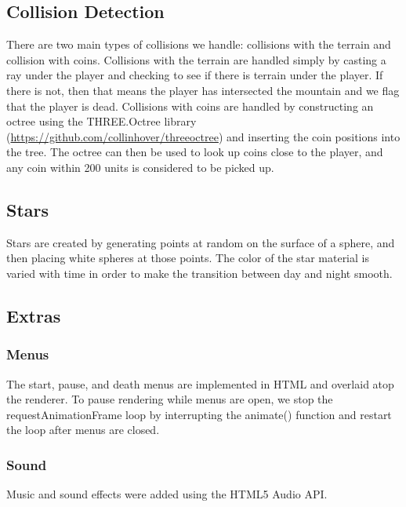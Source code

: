 \documentclass{article}
\begin{document}
\subsection{Collision Detection}
There are two main types of collisions we handle: collisions with the terrain and collision with coins. Collisions with the terrain are handled simply by casting a ray under the player and checking to see if there is terrain under the player. If there is not, then that means the player has intersected the mountain and we flag that the player is dead. Collisions with coins are handled by constructing an octree using the THREE.Octree library (\url{https://github.com/collinhover/threeoctree}) and inserting the coin positions into the tree. The octree can then be used to look up coins close to the player, and any coin within 200 units is considered to be picked up.

\subsection{Stars}
Stars are created by generating points at random on the surface of a sphere, and then placing white spheres at those points. The color of the star material is varied with time in order to make the transition between day and night smooth.

\subsection{Extras}
\subsubsection{Menus}
The start, pause, and death menus are implemented in HTML and overlaid atop the renderer. To pause rendering while menus are open, we stop the requestAnimationFrame loop by interrupting the animate() function and restart the loop after menus are closed.
\subsubsection{Sound}
Music and sound effects were added using the HTML5 Audio API.
\end{document}
